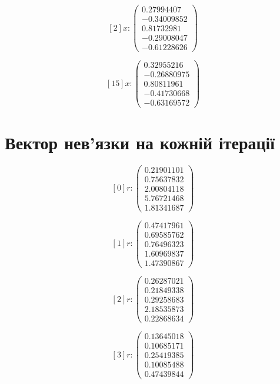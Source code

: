 \documentclass{article}
\begin{document}
    
$$ [2] x: \left(\begin{matrix}
    0.27994407 \\
    -0.34009852 \\
    0.81732981 \\
    -0.29008047 \\
    -0.61228626
\end{matrix}\right) $$   

    
$$ [15] x: \left(\begin{matrix}
    0.32955216 \\
    -0.26880975 \\
    0.80811961 \\
    -0.41730668 \\
    -0.63169572

\end{matrix}\right) $$
    \section{Вектор нев’язки на кожній ітерації}
    
    
$$ [0] r: \left(\begin{matrix}
    0.21901101 \\
    0.75637832 \\
    2.00804118 \\
    5.76721468 \\
    1.81341687
\end{matrix}\right) $$
   
   
   
$$ [1] r: \left(\begin{matrix}
    0.47417961 \\
    0.69585762 \\
    0.76496323 \\
    1.60969837 \\
    1.47390867
\end{matrix}\right) $$
   
   
   
 $$[2] r: \left(\begin{matrix}
    0.26287021 \\
    0.21849338 \\
    0.29258683 \\
    2.18535873 \\
    0.22868634
\end{matrix}\right) $$
   
   
   
$$ [3] r: \left(\begin{matrix}
    0.13645018 \\
    0.10685171 \\
    0.25419385 \\
    0.10085488 \\
    0.47439844
\end{matrix}\right) $$   
   
\end{document}
